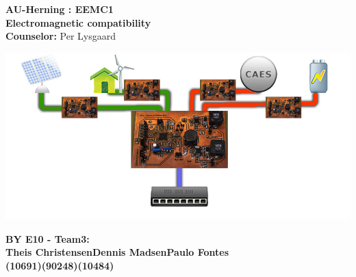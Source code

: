 \begin{centering}
\thispagestyle{empty} %
\begin{center}
\textbf{\Huge {AU-Herning : EEMC1\\[0.1cm]Electromagnetic compatibility}}\\
\huge { }\vspace{0.4cm}
\large{\textbf{Counselor:} Per Lysgaard}\\ \vspace{0.0cm}
\end{center}

\centering
\includegraphics[width=1\textwidth]{images/frontpage.jpg}
 \end{centering}
 
 
\begin{center}
\vspace{0.4cm}
\Large{\textbf{BY E10 - Team3: \\ \vspace{0.2cm}Theis Christensen\hspace{1.5cm}Dennis Madsen\hspace{1.5cm}Paulo Fontes}
\\\textbf{(10691)\hspace{3.7cm}(90248)\hspace{3.7cm}(10484)}}
\end{center}

\newpage
\thispagestyle{empty}
\mbox{}